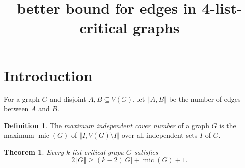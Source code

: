 \documentclass[12pt]{article}
\title{better bound for edges in 4-list-critical graphs}
\theoremstyle{plain}
\newtheorem{thm}{Theorem}[section]
\theoremstyle{definition}
\newtheorem{defn}{Definition}
\theoremstyle{remark}
\newcommand{\card}[1]{\left|#1\right|}
\newcommand{\size}[1]{\left\Vert#1\right\Vert}
\newcommand{\mic}{\operatorname{mic}}
\begin{document}
\maketitle
\begin{abstract}
\end{abstract}

\section{Introduction}
For a graph $G$ and disjoint $A, B \subseteq V(G)$, let $\size{A,B}$ be the number of edges between $A$ and $B$.

\begin{defn} The \emph{maximum independent cover number }of a graph $G$
	is the maximum $\mic(G)$ of $\size{I, V(G) \setminus I}$ over all independent sets $I$
	of $G$. 
\end{defn}

\begin{thm}\label{ConsantListMicStrength} 
	Every $k$-list-critical graph $G$ satisfies
	\[2\size{G} \ge (k-2)\card{G} + \mic(G) + 1.\]
\end{thm}
\end{document}
